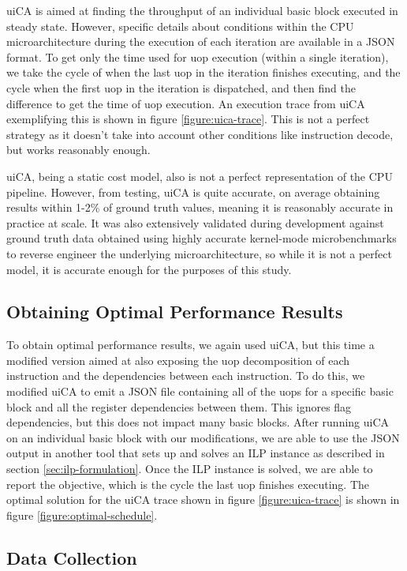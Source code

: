 \documentclass[sigconf]{acmart}
\begin{document}
uiCA is aimed at finding the throughput of an individual basic block executed in steady state. However,
specific details about conditions within the CPU microarchitecture during the execution of each iteration are
available in a JSON format. To get only the time used for uop execution (within a single iteration), we
take the cycle of when the last uop in the iteration finishes executing, and the cycle when the first uop in
the iteration is dispatched, and then find the difference to get the time of uop execution. An execution trace
from uiCA exemplifying this is shown in figure \ref{figure:uica-trace}. This is not a perfect
strategy as it doesn't take into account other conditions like instruction decode, but works reasonably enough.

uiCA, being a static cost model, also is not a perfect representation of the CPU pipeline. However, from testing,
uiCA is quite accurate, on average obtaining results within 1-2\% of ground truth values, meaning it is reasonably
accurate in practice at scale. It was also extensively validated during development against ground truth data
obtained using highly accurate kernel-mode microbenchmarks to reverse engineer the underlying microarchitecture, so
while it is not a perfect model, it is accurate enough for the purposes of this study.

\subsection{Obtaining Optimal Performance Results}

To obtain optimal performance results, we again used uiCA, but this time a modified version aimed at also
exposing the uop decomposition of each instruction and the dependencies between each instruction. To do this,
we modified uiCA to emit a JSON file containing all of the uops for a specific basic block and all the register
dependencies between them. This ignores flag dependencies, but this does not impact many basic blocks. After
running uiCA on an individual basic block with our modifications, we are able to use the JSON output in another
tool that sets up and solves an ILP instance as described in section \ref{sec:ilp-formulation}. Once the ILP instance
is solved, we are able to report the objective, which is the cycle the last uop finishes executing. The optimal solution
for the uiCA trace shown in figure \ref{figure:uica-trace} is shown in figure \ref{figure:optimal-schedule}.

\subsection{Data Collection}
\end{document}
